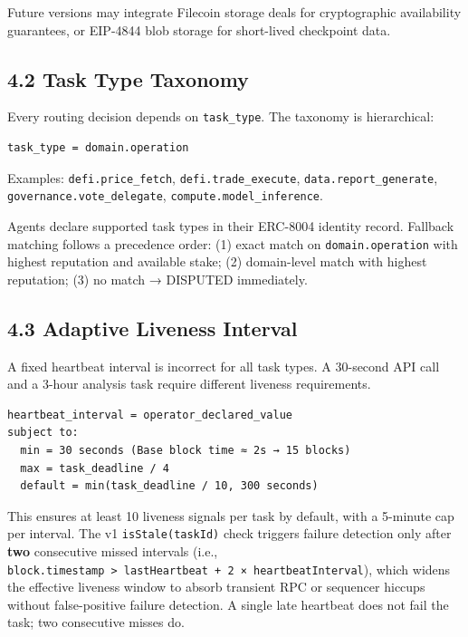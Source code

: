 \documentclass[
  10pt,
]{article}
\begin{document}
Future versions may integrate Filecoin storage deals for cryptographic
availability guarantees, or EIP-4844 blob storage for short-lived
checkpoint data.

\hypertarget{task-type-taxonomy}{%
\subsection{4.2 Task Type Taxonomy}\label{task-type-taxonomy}}

Every routing decision depends on \texttt{task\_type}. The taxonomy is
hierarchical:

\begin{verbatim}
task_type = domain.operation
\end{verbatim}

Examples: \texttt{defi.price\_fetch}, \texttt{defi.trade\_execute},
\texttt{data.report\_generate}, \texttt{governance.vote\_delegate},
\texttt{compute.model\_inference}.

Agents declare supported task types in their ERC-8004 identity record.
Fallback matching follows a precedence order: (1) exact match on
\texttt{domain.operation} with highest reputation and available stake;
(2) domain-level match with highest reputation; (3) no match → DISPUTED
immediately.

\hypertarget{adaptive-liveness-interval}{%
\subsection{4.3 Adaptive Liveness
Interval}\label{adaptive-liveness-interval}}

A fixed heartbeat interval is incorrect for all task types. A 30-second
API call and a 3-hour analysis task require different liveness
requirements.

\begin{verbatim}
heartbeat_interval = operator_declared_value
subject to:
  min = 30 seconds (Base block time ≈ 2s → 15 blocks)
  max = task_deadline / 4
  default = min(task_deadline / 10, 300 seconds)
\end{verbatim}

This ensures at least 10 liveness signals per task by default, with a
5-minute cap per interval. The v1 \texttt{isStale(taskId)} check
triggers failure detection only after \textbf{two} consecutive missed
intervals (i.e.,
\texttt{block.timestamp\ \textgreater{}\ lastHeartbeat\ +\ 2\ ×\ heartbeatInterval}),
which widens the effective liveness window to absorb transient RPC or
sequencer hiccups without false-positive failure detection. A single
late heartbeat does not fail the task; two consecutive misses do.
\end{document}
